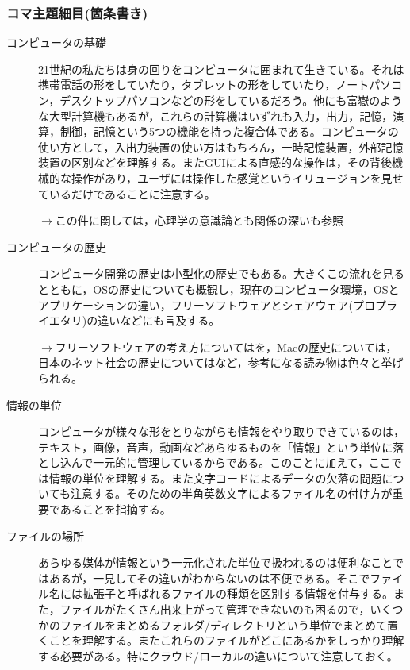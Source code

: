 \subsubsection{コマ主題細目(箇条書き)}
\begin{description}
    \item[コンピュータの基礎] 21世紀の私たちは身の回りをコンピュータに囲まれて生きている。それは携帯電話の形をしていたり，タブレットの形をしていたり，ノートパソコン，デスクトップパソコンなどの形をしているだろう。他にも富嶽のような大型計算機もあるが，これらの計算機はいずれも入力，出力，記憶，演算，制御，記憶という5つの機能を持った複合体である。コンピュータの使い方として，入出力装置の使い方はもちろん，一時記憶装置，外部記憶装置の区別などを理解する。またGUIによる直感的な操作は，その背後機械的な操作があり，ユーザには操作した感覚というイリュージョンを見せているだけであることに注意する。
    \begin{flushright}
        $\to$この件に関しては，心理学の意識論とも関係の深い\citet{トールノーレットランダーシュ2002}も参照
    \end{flushright}
    \item[コンピュータの歴史] コンピュータ開発の歴史は小型化の歴史でもある。大きくこの流れを見るとともに，OSの歴史についても概観し，現在のコンピュータ環境，OSとアプリケーションの違い，フリーソフトウェアとシェアウェア(プロプライエタリ)の違いなどにも言及する。
    \begin{flushright}
        $\to$フリーソフトウェアの考え方については\citet{ストールマン2003}を，Macの歴史については\citet{アイザックソン2012}，日本のネット社会の歴史については\citet{杉本2020}など，参考になる読み物は色々と挙げられる。
    \end{flushright}
     
    \item[情報の単位] コンピュータが様々な形をとりながらも情報をやり取りできているのは，テキスト，画像，音声，動画などあらゆるものを「情報」という単位に落とし込んで一元的に管理しているからである。このことに加えて，ここでは情報の単位を理解する。また文字コードによるデータの欠落の問題についても注意する。そのための半角英数文字によるファイル名の付け方が重要であることを指摘する。
     
    \item[ファイルの場所]あらゆる媒体が情報という一元化された単位で扱われるのは便利なことではあるが，一見してその違いがわからないのは不便である。そこでファイル名には拡張子と呼ばれるファイルの種類を区別する情報を付与する。また，ファイルがたくさん出来上がって管理できないのも困るので，いくつかのファイルをまとめるフォルダ/ディレクトリという単位でまとめて置くことを理解する。またこれらのファイルがどこにあるかをしっかり理解する必要がある。特にクラウド/ローカルの違いについて注意しておく。
    

\end{description}
